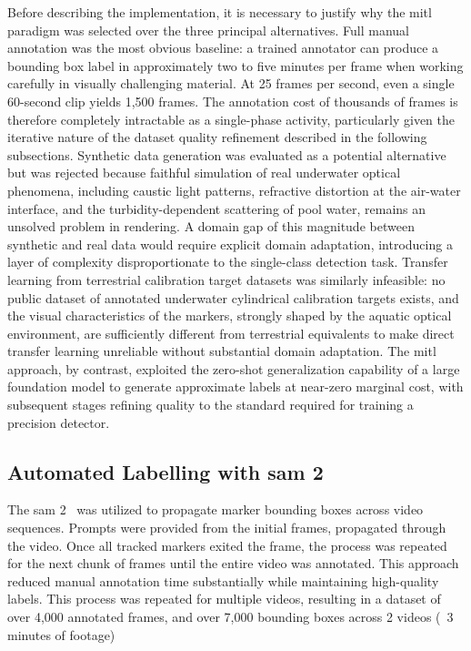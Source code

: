 Before describing the implementation, it is necessary to justify why the \gls{mitl} paradigm was
selected over the three principal alternatives. Full manual annotation was the most obvious
baseline: a trained annotator can produce a bounding box label in approximately two to five
minutes per frame when working carefully in visually challenging material. At 25 frames per
second, even a single 60-second clip yields 1,500 frames. The annotation cost of thousands of
frames is therefore completely intractable as a single-phase activity, particularly given the
iterative nature of the dataset quality refinement described in the following subsections.
Synthetic data generation was evaluated as a potential alternative but was rejected because
faithful simulation of real underwater optical phenomena, including caustic light patterns,
refractive distortion at the air-water interface, and the turbidity-dependent scattering of
pool water, remains an unsolved problem in rendering. A domain gap of this magnitude between
synthetic and real data would require explicit domain adaptation, introducing a layer of
complexity disproportionate to the single-class detection task. Transfer learning from
terrestrial calibration target datasets was similarly infeasible: no public dataset of
annotated underwater cylindrical calibration targets exists, and the visual characteristics
of the markers, strongly shaped by the aquatic optical environment, are sufficiently different
from terrestrial equivalents to make direct transfer learning unreliable without substantial
domain adaptation. The \gls{mitl} approach, by contrast, exploited the zero-shot generalization
capability of a large foundation model to generate approximate labels at near-zero marginal
cost, with subsequent stages refining quality to the standard required for training a precision
detector.

\subsection{Automated Labelling with \gls{sam} 2}

The \gls{sam} 2~\cite{ravi2024sam} was utilized to propagate marker
bounding boxes across video sequences. Prompts were provided from the initial frames,
propagated through the video. Once all tracked markers exited the frame, the process was
repeated for the next chunk of frames until the entire video was annotated. This approach
reduced manual annotation time substantially while maintaining high-quality labels. This process
was repeated for multiple videos, resulting in a dataset of over 4,000 annotated frames, and
over 7,000 bounding boxes across 2 videos (~3 minutes of footage)

